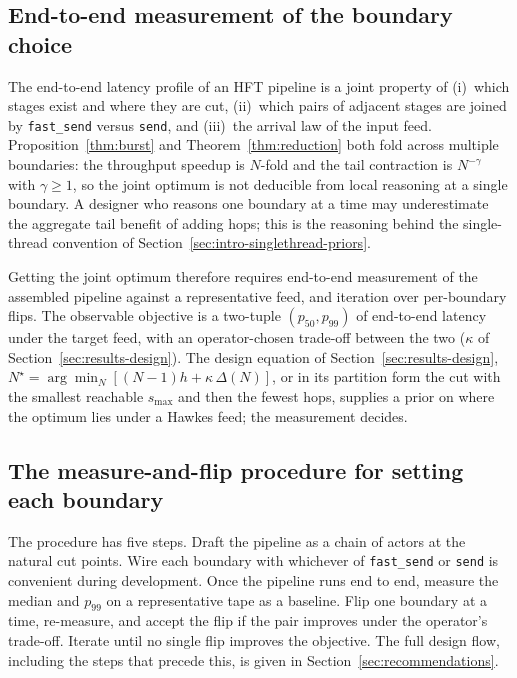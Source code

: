 \documentclass[11pt]{article}
\begin{document}
\subsection{End-to-end measurement of the boundary choice}
\label{sec:fungibility-why-measure}

The end-to-end latency profile of an HFT pipeline is a joint property of (i)~which stages
exist and where they are cut, (ii)~which pairs of adjacent stages are joined by
\texttt{fast\_send} versus \texttt{send}, and (iii)~the arrival law of the input feed.
Proposition~\ref{thm:burst} and Theorem~\ref{thm:reduction} both fold across multiple
boundaries: the throughput speedup is $N$-fold and the tail contraction is $N^{-\gamma}$
with $\gamma \ge 1$, so the joint optimum is not deducible from local reasoning at a
single boundary. A designer who reasons one boundary at a time may underestimate the
aggregate tail benefit of adding hops; this is the reasoning behind the single-thread
convention of Section~\ref{sec:intro-singlethread-priors}.

Getting the joint optimum therefore requires end-to-end measurement of the assembled
pipeline against a representative feed, and iteration over per-boundary flips. The
observable objective is a two-tuple $(p_{50}, p_{99})$ of end-to-end latency under the
target feed, with an operator-chosen trade-off between the two
($\kappa$ of Section~\ref{sec:results-design}). The design equation of
Section~\ref{sec:results-design}, $N^\star = \arg\min_N [(N-1)h + \kappa\,\Delta(N)]$,
or in its partition form the cut with the smallest reachable $s_{\max}$ and then the
fewest hops, supplies a prior on where the optimum lies under a Hawkes feed; the
measurement decides.

\subsection{The measure-and-flip procedure for setting each boundary}
\label{sec:fungibility-workflow}

The procedure has five steps. Draft the pipeline as a chain of actors at the natural
cut points. Wire each boundary with whichever of \texttt{fast\_send} or \texttt{send} is
convenient during development. Once the pipeline runs end to end, measure the median and
$p_{99}$ on a representative tape as a baseline. Flip one boundary at a time, re-measure,
and accept the flip if the pair improves under the operator's trade-off. Iterate until no
single flip improves the objective. The full design flow,
including the steps that precede this, is given in Section~\ref{sec:recommendations}.
\end{document}
